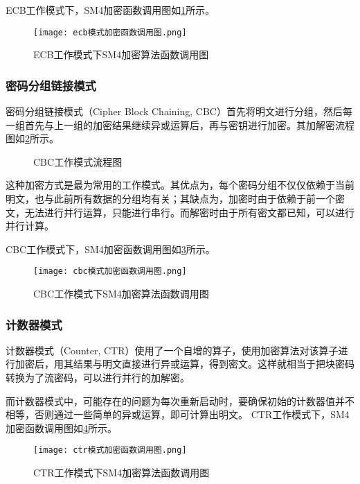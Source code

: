 \documentclass[a4paper, zihao=-4, UTF-8]{ctexart}
\begin{document}
					ECB工作模式下，SM4加密函数调用图如\cref{fig:ecb-sm4-function}所示。
					\begin{figure}[htbp]
						\centering
						\texttt{[image: ecb模式加密函数调用图.png]}
						\caption{ECB工作模式下SM4加密算法函数调用图}
						\label{fig:ecb-sm4-function}
					\end{figure}
				\subsubsection{密码分组链接模式}
					密码分组链接模式（Cipher Block Chaining, CBC）首先将明文进行分组，然后每一组首先与上一组的加密结果继续异或运算后，再与密钥进行加密。其加解密流程图如\cref{fig:CBC_crypt_flow}所示。
					
					\begin{figure}[htbp]
						\centering
						\caption{CBC工作模式流程图}
						\label{fig:CBC_crypt_flow}
					\end{figure}
					
					这种加密方式是最为常用的工作模式。其优点为，每个密码分组不仅仅依赖于当前明文，也与此前所有数据的分组均有关；其缺点为，加密时由于依赖于前一个密文，无法进行并行运算，只能进行串行。而解密时由于所有密文都已知，可以进行并行计算。
					
					CBC工作模式下，SM4加密函数调用图如\cref{fig:cbc-sm4-function}所示。
					\begin{figure}[htbp]
						\centering
						\texttt{[image: cbc模式加密函数调用图.png]}
						\caption{CBC工作模式下SM4加密算法函数调用图}
						\label{fig:cbc-sm4-function}
					\end{figure}
				\subsubsection{计数器模式}
					计数器模式（Counter, CTR）使用了一个自增的算子，使用加密算法对该算子进行加密后，用其结果与明文直接进行异或运算，得到密文。这样就相当于把块密码转换为了流密码，可以进行并行的加解密。
					
					而计数器模式中，可能存在的问题为每次重新启动时，要确保初始的计数器值并不相等，否则通过一些简单的异或运算，即可计算出明文。
					CTR工作模式下，SM4加密函数调用图如\cref{fig:ctr-sm4-function}所示。
					\begin{figure}[htbp]
						\centering
						\texttt{[image: ctr模式加密函数调用图.png]}
						\caption{CTR工作模式下SM4加密算法函数调用图}
						\label{fig:ctr-sm4-function}
					\end{figure}
\end{document}
